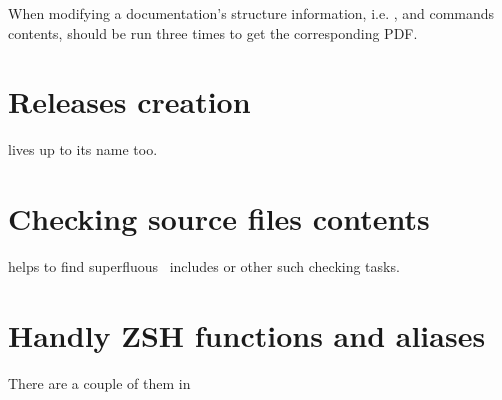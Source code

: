 When modifying a documentation's structure information, i.e. ,  and  commands contents,  should be run three times to get the corresponding PDF.


\section{Releases creation}

 lives up to its name too.


\section{Checking source files contents}

 helps to find superfluous \CPlusplus\ includes or other such checking tasks.


\section{Handly ZSH functions and aliases}

There are a couple of them in 

